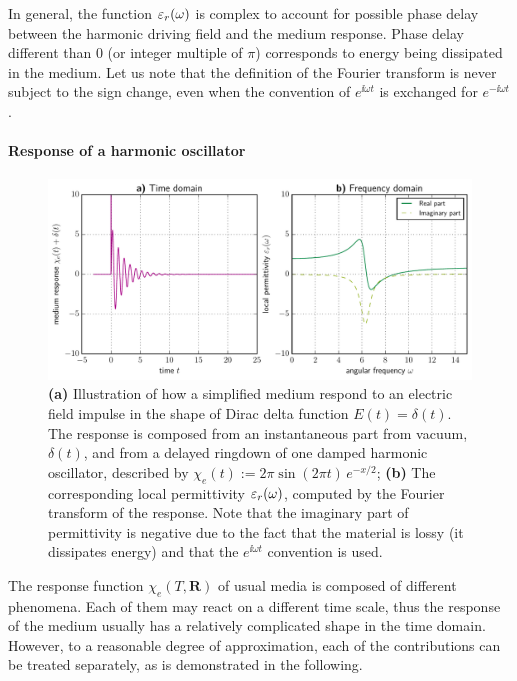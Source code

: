 In general, the function $\varepsilon_r(\omega)$ is complex to account for possible phase delay between the harmonic driving field and the medium response. Phase delay different than $0$ (or integer multiple of $\pi$) corresponds to energy being dissipated in the medium.
Let us note that the definition of the Fourier transform is never subject to the sign change, even when the convention of $e^{\ii \omega t}$ is exchanged for $e^{-\ii \omega t}$.
\paragraph{Response of a harmonic oscillator} \label{chap_lorentzmedia} %
\begin{figure}[t] \caption{\textbf{(a)} Illustration of how a simplified medium respond to an electric field impulse in the shape of Dirac delta function  $E(t) = \delta(t)$. The response is composed from an instantaneous part from vacuum, $\delta(t)$, and from a delayed ringdown of one damped harmonic oscillator, described by $\chi_e(t) := 2\pi \sin(2\pi t)\,e^{-x/2}$; \textbf{(b)} The corresponding local permittivity $\varepsilon_r(\omega)$, computed by the Fourier transform of the response. Note that the imaginary part of permittivity is negative due to the fact that the material is lossy (it dissipates energy) and that the $e^{\ii\omega t}$ convention is used.} \label{fg_oscillator_spectrum} \centering 
	\includegraphics[width=\textwidth]{img/oscillator_spectrum.pdf}
\end{figure}
The response function $\chi_e(T, \mathbf{R})$ of usual media is composed of different phenomena.  Each of them may react on a different time scale, thus the response of the medium usually has a relatively complicated shape in the time domain.  However, to a reasonable degree of approximation, each of the contributions can be treated separately, as is demonstrated in the following.

